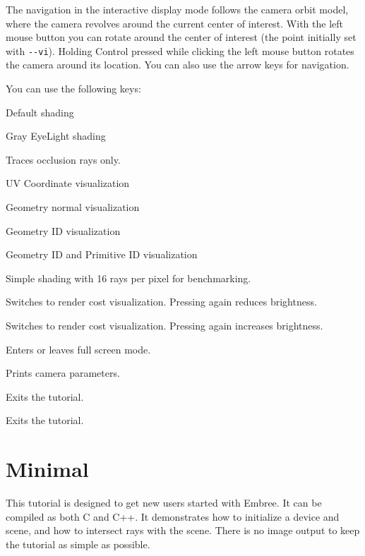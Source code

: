 \begin{Shaded}
\begin{Highlighting}[]
\OperatorTok{{-}{-}}\OperatorTok{=}\OperatorTok{,}\OperatorTok{=}
\end{Highlighting}
\end{Shaded}

The navigation in the interactive display mode follows the camera orbit
model, where the camera revolves around the current center of interest.
With the left mouse button you can rotate around the center of interest
(the point initially set with \texttt{-\/-vi}). Holding Control pressed
while clicking the left mouse button rotates the camera around its
location. You can also use the arrow keys for navigation.

You can use the following keys:

\begin{description}
\tightlist
\item[F1]
Default shading
\item[F2]
Gray EyeLight shading
\item[F3]
Traces occlusion rays only.
\item[F4]
UV Coordinate visualization
\item[F5]
Geometry normal visualization
\item[F6]
Geometry ID visualization
\item[F7]
Geometry ID and Primitive ID visualization
\item[F8]
Simple shading with 16 rays per pixel for benchmarking.
\item[F9]
Switches to render cost visualization. Pressing again reduces
brightness.
\item[F10]
Switches to render cost visualization. Pressing again increases
brightness.
\item[f]
Enters or leaves full screen mode.
\item[c]
Prints camera parameters.
\item[ESC]
Exits the tutorial.
\item[q]
Exits the tutorial.
\end{description}

\section{Minimal}\label{minimal}

This tutorial is designed to get new users started with Embree. It can
be compiled as both C and C++. It demonstrates how to initialize a
device and scene, and how to intersect rays with the scene. There is no
image output to keep the tutorial as simple as possible.

